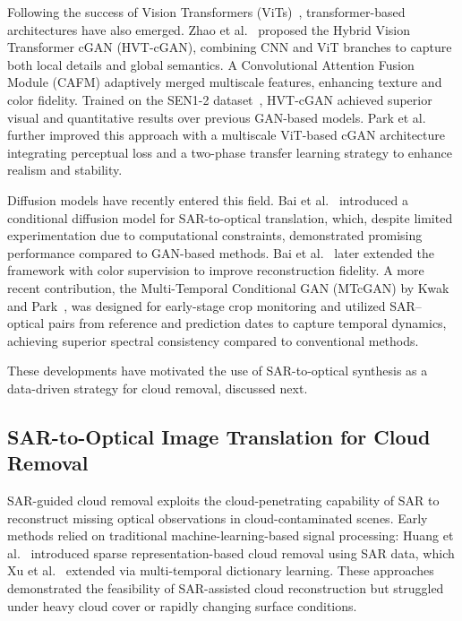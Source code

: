 Following the success of Vision Transformers (ViTs)~\cite{ViT_2020}, transformer-based architectures have also emerged. Zhao et al.~\cite{hvt_cgan} proposed the Hybrid Vision Transformer cGAN (HVT-cGAN), combining CNN and ViT branches to capture both local details and global semantics. A Convolutional Attention Fusion Module (CAFM) adaptively merged multiscale features, enhancing texture and color fidelity. Trained on the SEN1-2 dataset~\cite{sen12_2018}, HVT-cGAN achieved superior visual and quantitative results over previous GAN-based models. Park et al.~\cite{s2o_ViT_cGAN} further improved this approach with a multiscale ViT-based cGAN architecture integrating perceptual loss and a two-phase transfer learning strategy to enhance realism and stability.

Diffusion models have recently entered this field. Bai et al.~\cite{c_diffusion_s2o} introduced a conditional diffusion model for SAR-to-optical translation, which, despite limited experimentation due to computational constraints, demonstrated promising performance compared to GAN-based methods. Bai et al.~\cite{s2o_color_super_diff} later extended the framework with color supervision to improve reconstruction fidelity. A more recent contribution, the Multi-Temporal Conditional GAN (MTcGAN) by Kwak and Park~\cite{assessing_MT_cGANS_s2o_crop}, was designed for early-stage crop monitoring and utilized SAR–optical pairs from reference and prediction dates to capture temporal dynamics, achieving superior spectral consistency compared to conventional methods.

These developments have motivated the use of SAR-to-optical synthesis as a data-driven strategy for cloud removal, discussed next.

\subsection{SAR-to-Optical Image Translation for Cloud Removal}
SAR-guided cloud removal exploits the cloud-penetrating capability of SAR to reconstruct missing optical observations in cloud-contaminated scenes. Early methods relied on traditional machine-learning-based signal processing: Huang et al.~\cite{huang2015} introduced sparse representation-based cloud removal using SAR data, which Xu et al.~\cite{CR_spars_repre_MT_dict_L} extended via multi-temporal dictionary learning. These approaches demonstrated the feasibility of SAR-assisted cloud reconstruction but struggled under heavy cloud cover or rapidly changing surface conditions.

